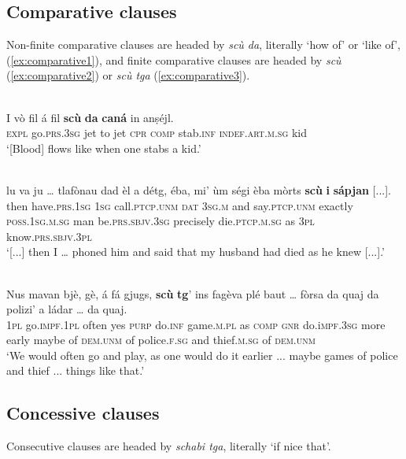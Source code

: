 \subsection{Comparative clauses}
Non-finite comparative clauses are headed by \textit{scù da}, literally `how of' or `like of', (\ref{ex:comparative1}), and finite comparative clauses are headed by \textit{scù} (\ref{ex:comparative2}) or \textit{scù tga} (\ref{ex:comparative3}).


\ea
\label{ex:comparative1}
\\
\gll  I vò fil á fil \textbf{scù} \textbf{da} \textbf{caná} in anṣéjl.\\
    \textsc{expl} go.\textsc{prs.3sg} jet to jet \textsc{cpr} \textsc{comp} stab.\textsc{inf} \textsc{indef.art.m.sg} kid \\
\glt `[Blood] flows like when one stabs a kid.'
\z

\ea
\label{ex:comparative2}
\\
\gll  [...] lu va ju … tlafònau dad èl a détg, éba, mi' ùm ségi èba mòrts \textbf{scù} \textbf{i} \textbf{sápjan} [...].\\
{} then have.\textsc{prs.1sg} \textsc{1sg} {} call.\textsc{ptcp.unm} \textsc{dat} \textsc{3sg.m} and say.\textsc{ptcp.unm} exactly \textsc{poss.1sg.m.sg} man be.\textsc{prs.sbjv.3sg} precisely die.\textsc{ptcp.m.sg} as \textsc{3pl} know.\textsc{prs.sbjv.3pl}\\ 
\glt `[...] then I … phoned him and said that my husband had died as he knew [...].'
\z

\ea
\label{ex:comparative3}
\\	
\gll Nus mavan bjè, gè, á fá gjugs, \textbf{scù} \textbf{tg}’ ins fagèva plé baut … fòrsa da quaj da polizi’ a ládar …  da quaj.   \\
\textsc{1pl} go.\textsc{impf.1pl} often yes \textsc{purp} do.\textsc{inf} game.\textsc{m.pl} as \textsc{comp} \textsc{gnr} do.i\textsc{mpf.3sg} more early {} maybe of \textsc{dem.unm} of police.\textsc{f.sg} and thief.\textsc{m.sg} {} of \textsc{dem.unm}\\
\glt `We would often go and play, as one would do it earlier ... maybe games of police and thief ... things like that.'
\z

\subsection{Concessive clauses}
Consecutive clauses are headed by \textit{schabi tga}, literally `if nice that'.

